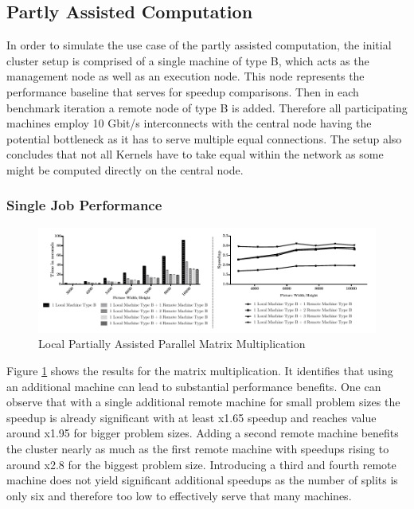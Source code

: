 \subsection{Partly Assisted Computation}

In order to simulate the use case of the partly assisted computation, the initial cluster setup is comprised of a single machine of type B, which acts as the management node as well as an execution node. This node represents the performance baseline that serves for speedup comparisons. Then in each benchmark iteration a remote node of type B is added. Therefore all participating machines employ 10 Gbit/s interconnects with the central node having the potential bottleneck as it has to serve multiple equal connections. The setup also concludes that not all Kernels have to take equal within the network as some might be computed directly on the central node.

\subsubsection*{Single Job Performance}
\label{single_job_performance}

\begin{figure}[!htb]
	
	\includegraphics[width=1.0\textwidth]{images/local_partially_assisted_matrix.pdf}
	\centering
	\caption{Local Partially Assisted Parallel Matrix Multiplication}
	\label{img:parallel_matrix}
\end{figure}

Figure \ref{img:parallel_matrix} shows the results for the matrix multiplication. It identifies that using an additional machine can lead to substantial performance benefits. One can observe that with a single additional remote machine for small problem sizes the speedup is already significant with at least x1.65 speedup and reaches value around x1.95 for bigger problem sizes. Adding a second remote machine benefits the cluster nearly as much as the first remote machine with speedups rising to around x2.8 for the biggest problem size. Introducing a third and fourth remote machine does not yield significant additional speedups as the number of splits is only six and therefore too low to effectively serve that many machines.

